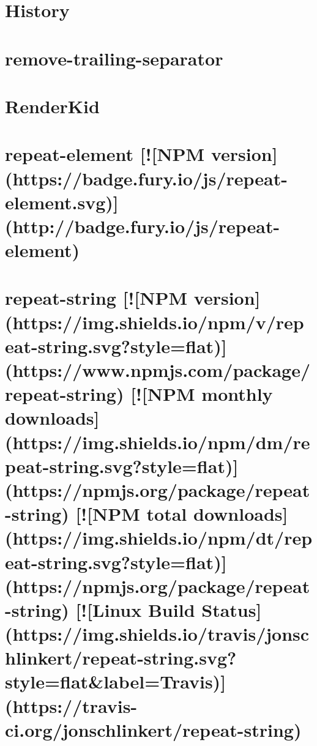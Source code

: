 \documentclass[twoside]{book}
\newcommand{\+}{\discretionary{\mbox{\scriptsize$\hookleftarrow$}}{}{}}
\begin{document}
\chapter{History}
\label{md__c_1_workspace_demo_src_main_script_node_modules_remove-trailing-separator_history}

\chapter{remove-\/trailing-\/separator}
\label{md__c_1_workspace_demo_src_main_script_node_modules_remove-trailing-separator_readme}

\chapter{Render\+Kid}
\label{md__c_1_workspace_demo_src_main_script_node_modules_renderkid__r_e_a_d_m_e}

\chapter{repeat-\/element \mbox{[}!\mbox{[}N\+PM version\mbox{]}(https\+://badge.fury.\+io/js/repeat-\/element.svg)\mbox{]}(http\+://badge.fury.\+io/js/repeat-\/element)}
\label{md__c_1_workspace_demo_src_main_script_node_modules_repeat-element__r_e_a_d_m_e}

\chapter{repeat-\/string \mbox{[}!\mbox{[}N\+PM version\mbox{]}(https\+://img.shields.\+io/npm/v/repeat-\/string.svg?style=flat)\mbox{]}(https\+://www.npmjs.\+com/package/repeat-\/string) \mbox{[}!\mbox{[}N\+PM monthly downloads\mbox{]}(https\+://img.shields.\+io/npm/dm/repeat-\/string.svg?style=flat)\mbox{]}(https\+://npmjs.org/package/repeat-\/string) \mbox{[}!\mbox{[}N\+PM total downloads\mbox{]}(https\+://img.shields.\+io/npm/dt/repeat-\/string.svg?style=flat)\mbox{]}(https\+://npmjs.org/package/repeat-\/string) \mbox{[}!\mbox{[}Linux Build Status\mbox{]}(https\+://img.shields.\+io/travis/jonschlinkert/repeat-\/string.svg?style=flat\&label=Travis)\mbox{]}(https\+://travis-\/ci.org/jonschlinkert/repeat-\/string)}
\label{md__c_1_workspace_demo_src_main_script_node_modules_repeat-string__r_e_a_d_m_e}

\end{document}

